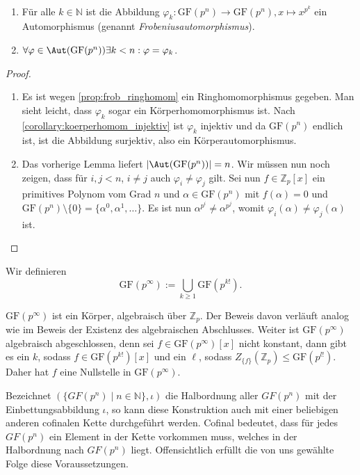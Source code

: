 \begin{theorem}{\ }
    \begin{enumerate}
        \item Für alle $k\in\mathbb{N}$ ist die Abbildung $\varphi_k: \mathrm{GF}(p^n) \to \mathrm{GF}(p^n), x \mapsto x^{p^k}$ ein Automorphismus (genannt \emph{Frobeniusautomorphismus}). 
        \item $\forall \varphi \in \Aut(\mathrm{GF}(p^n)) \exists k < n: \varphi = \varphi_k$.
    \end{enumerate}
\end{theorem}
\begin{proof}{\ }
    \begin{enumerate}
        \item Es ist wegen \cref*{prop:frob_ringhomom} ein Ringhomomorphismus gegeben. Man sieht leicht, dass $\varphi_k$ sogar ein Körperhomomorphismus ist. Nach \cref*{corollary:koerperhomom_injektiv} ist $\varphi_k$ injektiv und da $\mathrm{GF}(p^n)$ endlich ist, ist die Abbildung surjektiv, also ein Körperautomorphismus.
        
        \item Das vorherige Lemma liefert $\vert \Aut(\mathrm{GF}(p^n)) \vert = n$. Wir müssen nun noch zeigen, dass für $i, j < n$, $i \not= j$ auch $\varphi_i \not= \varphi_j$ gilt. Sei nun $f \in \mathbb{Z}_p[x]$ ein primitives Polynom vom Grad $n$ und $\alpha\in\mathrm{GF}(p^n)$ mit $f(\alpha) = 0$ und $\mathrm{GF}(p^n)\setminus\{0\} = \{\alpha^0, \alpha^1, \ldots\}$. Es ist nun $\alpha^{p^i} \not= \alpha^{p^j}$, womit $\varphi_i(\alpha) \not= \varphi_j(\alpha)$ ist.
    \end{enumerate}
\end{proof}

\begin{definition}
    Wir definieren 
        $$ \mathrm{GF}\left(p^\infty\right) := \bigcup_{k \ge 1} \mathrm{GF}\left(p^{k!}\right). $$
\end{definition}
\begin{remark}
    $\mathrm{GF}(p^\infty)$ ist ein Körper, algebraisch über $\mathbb{Z}_p$. Der Beweis davon verläuft analog wie im Beweis der Existenz des algebraischen Abschlusses. Weiter ist $\mathrm{GF}(p^\infty)$ algebraisch abgeschlossen, denn sei $f \in \mathrm{GF}(p^\infty)[x]$ nicht konstant, dann gibt es ein $k$, sodass $f \in \mathrm{GF}(p^{k!})[x]$ und ein $\mathbb{\ell}$, sodass $Z_{\{f\}}(\mathbb{Z}_p) \le \mathrm{GF}(p^{l!})$. Daher hat $f$ eine Nullstelle in $\mathrm{GF}(p^\infty)$.

    Bezeichnet $(\{GF(p^{n})\mid n\in\mathbb{N}\},\iota)$ die Halbordnung aller $GF(p^n)$ mit der Einbettungsabbildung $\iota$, so kann diese Konstruktion auch mit einer beliebigen anderen cofinalen Kette durchgeführt werden. Cofinal bedeutet, dass für jedes $GF(p^n)$ ein Element in der Kette vorkommen muss, welches in der Halbordnung nach $GF(p^n)$ liegt. Offensichtlich erfüllt die von uns gewählte Folge diese Voraussetzungen.
\end{remark}